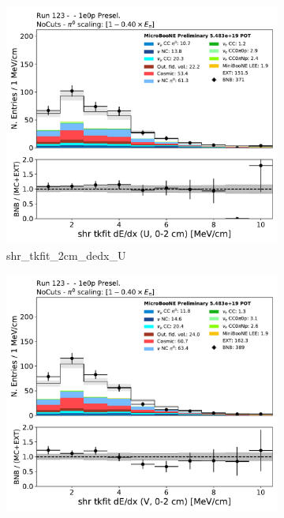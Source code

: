 \begin{figure}[H] 
\begin{center}
    \begin{subfigure}[b]{0.3\textwidth}
    \centering
    \includegraphics[width=1.00\textwidth]{1e0p/dataMCRun123/shr_tkfit_2cm_dedx_U.pdf}
    \caption{\label{fig:1e0p:dataMCRun1:shr_tkfit_2cm_dedx_U} shr\_tkfit\_2cm\_dedx\_U }
    \end{subfigure}
    \begin{subfigure}[b]{0.3\textwidth}
    \centering
    \includegraphics[width=1.00\textwidth]{1e0p/dataMCRun123/shr_tkfit_2cm_dedx_V.pdf}

\end{subfigure}
\end{center}
\end{figure}
